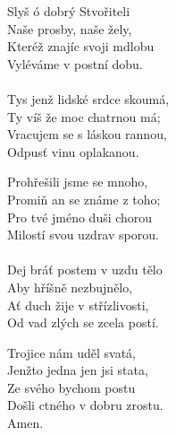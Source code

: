 \begin{translatioMulticol}{3}
Slyš ó dobrý Stvořiteli\\
Naše prosby, naše žely,\\
Kteréž znajíc svoji mdlobu\\
Vyléváme v postní dobu.\\
\\
Tys jenž lidské srdce skoumá,\\
Ty víš že moc chatrnou má; \\
Vracujem se s láskou rannou, \\
Odpusť vinu oplakanou.\columnbreak

Prohřešili jsme se mnoho,\\
Promiň an se známe z toho;\\
Pro tvé jméno duši chorou\\
Milostí svou uzdrav sporou.\\
\\
Dej bráť postem v uzdu tělo\\
Aby hříšně nezbujnělo,\\
Ať duch žije v střízlivosti,\\
Od vad zlých se zcela postí.\columnbreak

Trojice nám uděl svatá,\\
Jenžto jedna jen jsi stata,\\
Ze svého bychom postu\\
Došli ctného v dobru zrostu.\\
Amen.
\end{translatioMulticol}
